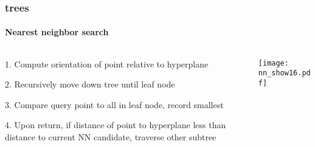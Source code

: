 \begin{frame}[noframenumbering]
  \frametitle{\kd trees}
  \framesubtitle{Nearest neighbor search}
  \begin{columns}[T]
    \begin{column}{.5\textwidth}
      \begin{block}{}%
        {\color{white} 1.\hspace{1mm} Compute orientation of point relative to hyperplane
          \\\vspace{0.4cm}
        
        2.\hspace{1mm} Recursively move down tree until leaf node\\\vspace{0.4cm}

        3.\hspace{1mm} Compare query point to all in leaf node, record smallest\\\vspace{0.4cm}
    
        4.\hspace{1mm} Upon return, if distance of point to hyperplane less than distance to current
          NN candidate, traverse other subtree}
      \end{block}
    \end{column}
    \begin{column}{.5\textwidth}
      \begin{block}{}
        \texttt{[image: nn\_show16.pdf]}
      \end{block}
    \end{column}
  \end{columns}
\end{frame}
